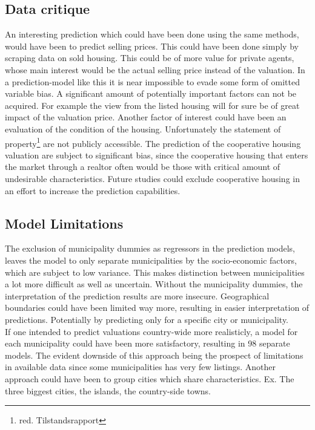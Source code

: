\documentclass[12pt,a4paper]{article}
\begin{document}
\subsection{Data critique}
An interesting prediction which could have been done using the same methods, would have been to predict selling prices. This could have been done simply by scraping data on sold housing. This could be of more value for private agents, whose main interest would be the actual selling price instead of the valuation. \newline 
In a prediction-model like this it is near impossible to evade some form of omitted variable bias. A significant amount of potentially important factors can not be acquired. For example the view from the listed housing will for sure be of great impact of the valuation price. Another factor of interest could have been an evaluation of the condition of the housing. Unfortunately the statement of property\footnote{red. Tilstandsrapport} are not publicly accessible. \newline
The prediction of the cooperative housing valuation %
are subject to significant bias, since the cooperative housing that enters the market through a realtor often would be those with critical amount of undesirable characteristics. Future studies could exclude cooperative housing in an effort to increase the prediction capabilities.  

\subsection{Model Limitations}
The exclusion of municipality dummies as regressors in the prediction models, leaves the model to only separate municipalities by the socio-economic factors, which are subject to low variance. This makes distinction between municipalities a lot more difficult as well as uncertain.   
Without the municipality dummies, the interpretation of the prediction results are more insecure. %
Geographical boundaries could have been limited way more, resulting in easier interpretation of predictions. Potentially by predicting only for a specific city or municipality. \\
If one intended to predict valuations country-wide more realisticly, a model for each municipality could have been more satisfactory, resulting in 98 separate models. The evident downside of this approach being the prospect of limitations in available data since some municipalities has very few listings.     
Another approach could have been to group cities which share characteristics. Ex. The three biggest cities, the islands, the country-side towns.    
\end{document}
